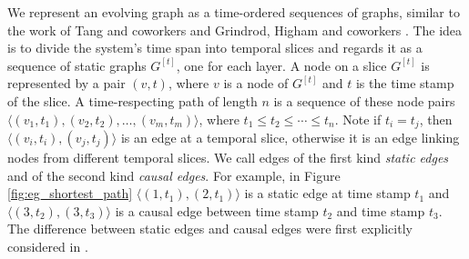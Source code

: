 \documentclass[12pt]{article}
\theoremstyle{definition}
\begin{document}
We represent an evolving graph as a time-ordered sequences of graphs, similar to the work of Tang and coworkers \cite{nicosia13, tang09, tang102, tang10} and Grindrod, Higham and coworkers \cite{grindrod13,grindrod11}. The idea is to divide the system's time span into temporal slices and regards it as a sequence of static graphs $G^{[t]}$, one for each layer. A node on a slice $G^{[t]}$ is represented by a pair $(v, t)$, where $v$ is a node of
$G^{[t]}$ and $t$ is the time stamp of the slice. A time-respecting path of length $n$ is a sequence of these node pairs $\langle (v_1, t_1), (v_2, t_2), \ldots ,(v_m, t_m)\rangle$, where $t_1 \le t_2 \le \cdots \le t_n$. Note if $t_i = t_j$, then $\langle (v_i, t_i), (v_j, t_j) \rangle$ is an edge at a temporal slice,  otherwise it is an edge linking nodes from different temporal slices.
We call edges of the first kind \emph{static edges} and of the second kind
\emph{causal edges}.
For example, in Figure \ref{fig:eg_shortest_path}
$\langle (1, t_1), (2, t_1) \rangle$ is a static edge at time stamp $t_1$ and $\langle (3, t_2), (3, t_3) \rangle$ is a causal edge between time stamp $t_2$ and time stamp $t_3$.
The difference between static edges and causal edges were first explicitly considered in \cite{chen16}.
\end{document}
